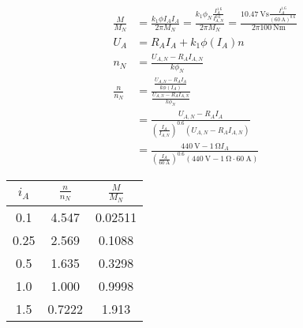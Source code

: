 \documentclass[11pt,a4paper]{scrartcl}
\newcommand{\mybr}[1]{\left(#1\right)}
\newcommand{\0}{_{\mybr{0}}}
\newcommand{\1}{_{\mybr{1}}}
\newcommand{\2}{_{\mybr{2}}}
\begin{document}
\subsection{}
\begin{align}
\frac{M}{M_N}&=\frac{k_1\phi{I_A}I_A}{2\pi M_N}=\frac{k_1\phi_N\frac{I_A^{\num{1.6}}}{I_{A,N}^{\num{0.6}}}}{2\pi M_N}=\frac{\SI{10.47}{\volt\second}\frac{I_A^{\num{1.6}}}{\mybr{\SI{60}{\ampere}}^{\num{0.6}}}}{2\pi\SI{100}{\newton\metre}}\\
U_A&=R_A I_A + k_1 \phi\mybr{I_A} n\\
n_N&=\frac{U_{A,N}-R_A I_{A,N}}{k\phi_N}\\
\frac{n}{n_N}&=\frac{\frac{U_{A,N}-R_A I_A}{k\phi\mybr{I_A}}}{\frac{U_{A,N}-R_A I_{A,N}}{k\phi_N}}\\
&=\frac{U_{A,N}-R_A I_A}{\mybr{\frac{I_A}{I_{A,N}}}^{\num{0.6}}\mybr{U_{A,N}-R_A I_{A,N}}}\\
&=\frac{\SI{440}{\volt}-\SI{1}{\ohm}I_A}{\mybr{\frac{I_A}{\SI{60}{\ampere}}}^{\num{0.6}}\mybr{\SI{440}{\volt}-\SI{1}{\ohm}\cdot\SI{60}{\ampere}}}
\end{align}
\begin{table}[htbp]
	\begin{center}
	\begin{tabular}{SSS}
		\toprule
		{$i_A$} & {$\frac{n}{n_N}$} & {$\frac{M}{M_N}$} \\
		 & 4.547 & 0.02511 \\
		0.25 & 2.569 & 0.1088 \\
		0.5 & 1.635 & 0.3298 \\
		1.0 & 1.000 & 0.9998 \\
		1.5 & 0.7222 & 1.913 \\
		\bottomrule
	\end{tabular}
	\end{center}
\end{table}
\begin{figure*}[!hp]
\centering
{}
\end{figure*}
\end{document}
